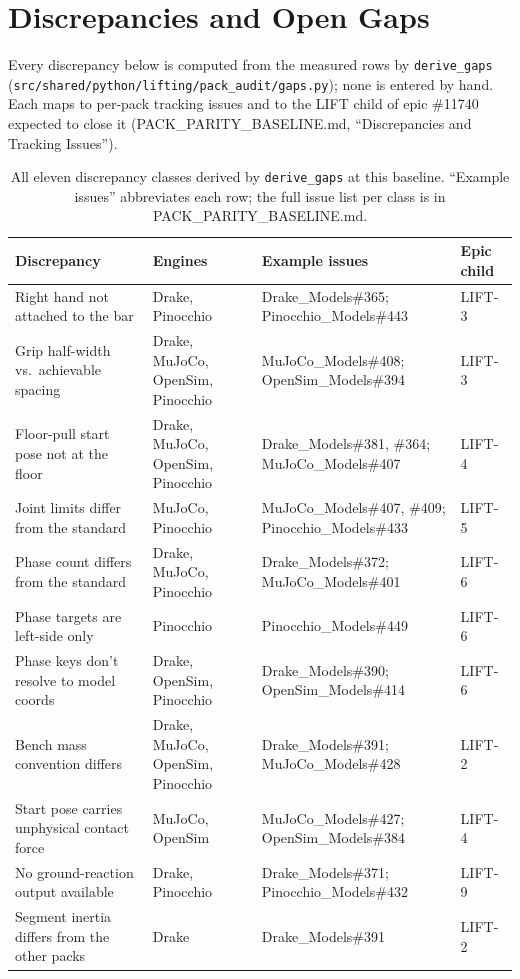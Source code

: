 \documentclass[11pt,a4paper]{article}
\begin{document}
\section{Discrepancies and Open Gaps}\label{sec:gaps}
Every discrepancy below is computed from the measured rows by
\texttt{derive\_gaps} (\texttt{src/shared/python/lifting/pack\_audit/gaps.py});
none is entered by hand. Each maps to per-pack tracking issues and to the
LIFT child of epic \#11740 expected to close it
(PACK\_PARITY\_BASELINE.md, ``Discrepancies and Tracking Issues'').

\begin{table}[h]
\centering\footnotesize
\begin{tabular}{p{4.6cm}lp{3.6cm}l}
\toprule
Discrepancy & Engines & Example issues & Epic child\\
\midrule
Right hand not attached to the bar & Drake, Pinocchio & Drake\_Models\#365; Pinocchio\_Models\#443 & LIFT-3\\
Grip half-width vs.\ achievable spacing & Drake, MuJoCo, OpenSim, Pinocchio & MuJoCo\_Models\#408; OpenSim\_Models\#394 & LIFT-3\\
Floor-pull start pose not at the floor & Drake, MuJoCo, OpenSim, Pinocchio & Drake\_Models\#381, \#364; MuJoCo\_Models\#407 & LIFT-4\\
Joint limits differ from the standard & MuJoCo, Pinocchio & MuJoCo\_Models\#407, \#409; Pinocchio\_Models\#433 & LIFT-5\\
Phase count differs from the standard & Drake, MuJoCo, Pinocchio & Drake\_Models\#372; MuJoCo\_Models\#401 & LIFT-6\\
Phase targets are left-side only & Pinocchio & Pinocchio\_Models\#449 & LIFT-6\\
Phase keys don't resolve to model coords & Drake, OpenSim, Pinocchio & Drake\_Models\#390; OpenSim\_Models\#414 & LIFT-6\\
Bench mass convention differs & Drake, MuJoCo, OpenSim, Pinocchio & Drake\_Models\#391; MuJoCo\_Models\#428 & LIFT-2\\
Start pose carries unphysical contact force & MuJoCo, OpenSim & MuJoCo\_Models\#427; OpenSim\_Models\#384 & LIFT-4\\
No ground-reaction output available & Drake, Pinocchio & Drake\_Models\#371; Pinocchio\_Models\#432 & LIFT-9\\
Segment inertia differs from the other packs & Drake & Drake\_Models\#391 & LIFT-2\\
\bottomrule
\end{tabular}
\caption{All eleven discrepancy classes derived by \texttt{derive\_gaps} at
this baseline. ``Example issues'' abbreviates each row; the full issue list
per class is in PACK\_PARITY\_BASELINE.md.}
\end{table}
\end{document}
